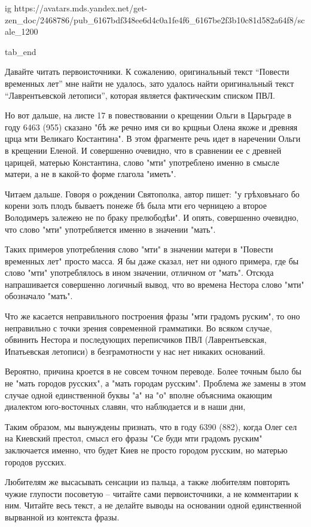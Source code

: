 	ig https://avatars.mds.yandex.net/get-zen_doc/2468786/pub_6167bdf348ee6d4c0a1fe4f6_6167be2f3b10c81d582a64f8/scale_1200

tab_end
\fi

Давайте читать первоисточники. К сожалению, оригинальный текст \enquote{Повести
временных лет} мне найти не удалось, зато удалось найти оригинальный текст
\enquote{Лаврентьевской летописи}, которая является фактическим списком ПВЛ.

Но вот дальше, на листе 17 в повествовании о крещении Ольги в Царьграде в году
6463 (955) сказано "бѣ же речно имя си во крщньи Олена якоже и древняя црца мти
Великаго Костантина". В этом фрагменте речь идет в наречении Ольги в крещении
Еленой. И совершенно очевидно, что в сравнении ее с древней царицей, матерью
Константина, слово "мти" употреблено именно в смысле матери, а не в какой-то
форме глагола "иметь".

Читаем дальше. Говоря о рождении Святополка, автор пишет: "у грѣховънаго бо
корени золъ плодъ бываетъ понеже бѣ была мти его черницею а второе Володимеръ
залежею не по браку прелюбодѣи". И опять, совершенно очевидно, что слово "мти"
употребляется именно в значении "мать".

Таких примеров употребления слово "мти" в значении матери в "Повести временных
лет" просто масса. Я бы даже сказал, нет ни одного примера, где бы слово "мти"
употреблялось в ином значении, отличном от "мать". Отсюда напрашивается
совершенно логичный вывод, что во времена Нестора слово "мти" обозначало
"мать".

Что же касается неправильного построения фразы "мти градомъ руским", то оно
неправильно с точки зрения современной грамматики. Во всяком случае, обвинить
Нестора и последующих переписчиков ПВЛ (Лаврентьевская, Ипатьевская летописи) в
безграмотности у нас нет никаких оснований.

Вероятно, причина кроется в не совсем точном переводе. Более точным было бы не
"мать городов русских", а "мать городам русским". Проблема же замены в этом
случае одной единственной буквы "а" на "о" вполне объяснима окающим диалектом
юго-восточных славян, что наблюдается и в наши дни,

Таким образом, мы вынуждены признать, что в году 6390 (882), когда Олег сел на
Киевский престол, смысл его фразы "Се буди мти градомъ руским" заключается
именно, что будет Киев не просто городом русским, но матерью городов русских.

Любителям же высасывать сенсации из пальца, а также любителям повторять чужие
глупости посоветую – читайте сами первоисточники, а не комментарии к ним.
Читайте весь текст, а не делайте выводы на основании одной единственной
вырванной из контекста фразы.

